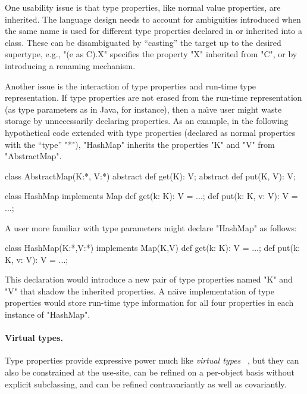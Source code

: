 One usability issue is that
type properties, like normal value properties, are inherited.
The language design needs
to account for ambiguities introduced when the same name is
used for different type properties declared in or inherited into a class.
These can be disambiguated
by ``casting'' the target up to the desired supertype,
e.g., \xcd"(e as C).X" specifies
the property \xcd"X" inherited from \xcd"C", or by introducing a
renaming mechanism.

Another issue is the interaction of type properties and run-time
type representation.  If type properties are not erased from
the run-time representation (as
type parameters as in Java, for instance), then a na{\"\i}ve user
might waste storage by unnecessarily declaring properties.
As an example, in the following hypothetical code extended with
type properties (declared as normal properties with the ``type''
\xcd"*"),
\xcd"HashMap"  inherits the properties \xcd"K" and \xcd"V" from
\xcd"AbstractMap".
\begin{xten}
class AbstractMap(K:*, V:*) {
  abstract def get(K): V;
  abstract def put(K, V): V;
}

class HashMap implements Map {
  def get(k: K): V = ...;
  def put(k: K, v: V): V = ...;
}
\end{xten}
A user more familiar with type parameters might declare
\xcd"HashMap" as follows:
\begin{xten}
class HashMap(K:*,V:*) implements Map(K,V) {
  def get(k: K): V = ...;
  def put(k: K, v: V): V = ...;
}
\end{xten}
This declaration would introduce a new pair of type properties
named \xcd"K" and
\xcd"V" that shadow the inherited properties.
A na{\"\i}ve implementation of type properties would store run-time
type information for all four properties in each instance
of \xcd"HashMap".

\paragraph{Virtual types.}

Type properties provide expressive power much like 
\emph{virtual types}~\cite{beta,mp89-virtual-classes,ernst06-virtual}
, but they can also
be constrained at the use-site,
can be refined on a per-object basis without explicit subclassing,
and can be refined contravariantly as well as covariantly.

